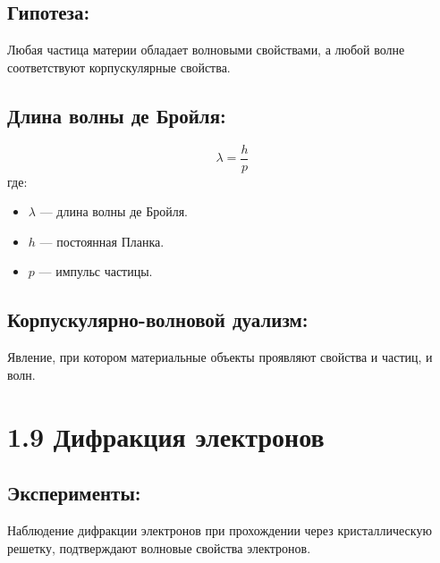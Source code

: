 \documentclass[a4paper,12pt]{article}
\begin{document}
\subsection*{Гипотеза:}
\vspace{-3pt}
Любая частица материи обладает волновыми свойствами, а любой волне соответствуют корпускулярные свойства.

\vspace{-9pt}
\subsection*{Длина волны де Бройля:}
\vspace{-3pt}
\vspace{-0.05em}
$$ \lambda = \frac{h}{p} $$
где:
\begin{itemize}[itemsep=0pt, topsep=0pt, parsep=3pt]
    \item $\lambda$ — длина волны де Бройля.
    \item $h$ — постоянная Планка.
    \item $p$ — импульс частицы.
\end{itemize}

\vspace{-9pt}
\subsection*{Корпускулярно-волновой дуализм:}
\vspace{-3pt}
Явление, при котором материальные объекты проявляют свойства и частиц, и волн.


\section*{1.9 Дифракция электронов}
\vspace{-9pt}
\subsection*{Эксперименты:}
\vspace{-3pt}
Наблюдение дифракции электронов при прохождении через кристаллическую решетку, подтверждают волновые свойства электронов.
\end{document}
